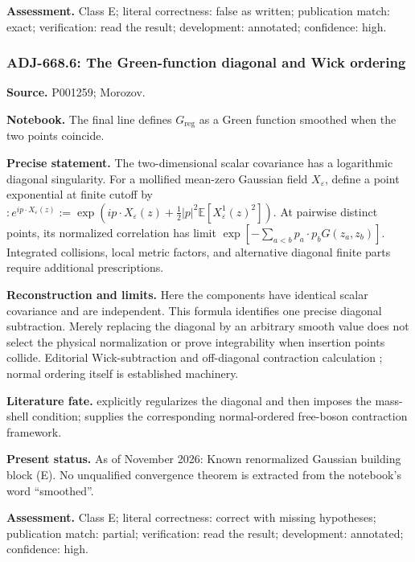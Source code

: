 \noindent\textbf{Assessment.} Class E; literal correctness: false as written; publication match: exact; verification: read the result; development: annotated; confidence: high.\par

\subsubsection{ADJ-668.6: The Green-function diagonal and Wick ordering}
\noindent\textbf{Source.} P001259; Morozov.\par
\noindent\textbf{Notebook.} The final line defines \(G_{\mathrm{reg}}\) as a Green function smoothed when the two points coincide.\par

\noindent\textbf{Precise statement.} The two-dimensional scalar covariance has a logarithmic diagonal singularity. For a mollified mean-zero Gaussian field \(X_\varepsilon\), define a point exponential at finite cutoff by \(:e^{ip\cdot X_\varepsilon(z)}:=\exp(ip\cdot X_\varepsilon(z)+\frac12|p|^2\mathbb E[X_\varepsilon^1(z)^2])\). At pairwise distinct points, its normalized correlation has limit \(\exp[-\sum_{a<b}p_a\cdot p_bG(z_a,z_b)]\). Integrated collisions, local metric factors, and alternative diagonal finite parts require additional prescriptions.\par

\noindent\textbf{Reconstruction and limits.} Here the components have identical scalar covariance and are independent. This formula identifies one precise diagonal subtraction. Merely replacing the diagonal by an arbitrary smooth value does not select the physical normalization or prove integrability when insertion points collide. Editorial Wick-subtraction and off-diagonal contraction calculation \oursComputed; normal ordering itself is established machinery.\par

\noindent\textbf{Literature fate.} \citet[\S6, between (6.24) and (6.26)]{belavinknizhnik1986complex} explicitly regularizes the diagonal and then imposes the mass-shell condition; \citet[\S3]{dotsenkofateev1984conformal} supplies the corresponding normal-ordered free-boson contraction framework.\par

\noindent\textbf{Present status.} As of November 2026: Known renormalized Gaussian building block (E). No unqualified convergence theorem is extracted from the notebook's word ``smoothed''.\par

\noindent\textbf{Assessment.} Class E; literal correctness: correct with missing hypotheses; publication match: partial; verification: read the result; development: annotated; confidence: high.\par

